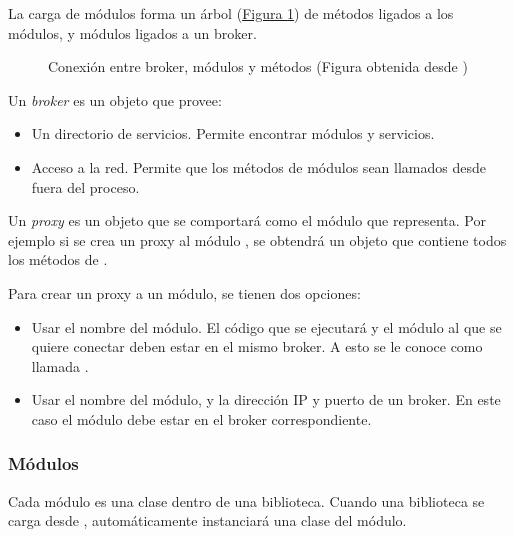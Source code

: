 La carga de módulos forma un árbol (\hyperref[\detokenize{chapter_one/naoqi:broker-mod-meth}]{Figura \ref{\detokenize{chapter_one/naoqi:broker-mod-meth}}}) de métodos
ligados a los módulos, y módulos ligados a un broker.

\begin{figure}[htbp]
\centering
\capstart

\noindent{}
\caption{Conexión entre broker, módulos y métodos (Figura obtenida desde \cite{brokermodulesmethods})}\label{\detokenize{chapter_one/naoqi:broker-mod-meth}}\end{figure}


\label{\detokenize{chapter_one/naoqi:broker}}
Un \textit{broker} es un objeto que provee:
\begin{itemize}
\item {} 
Un directorio de servicios. Permite encontrar módulos y servicios.

\item {} 
Acceso a la red. Permite que los métodos de módulos sean llamados desde fuera del proceso.

\end{itemize}

\label{\detokenize{chapter_one/naoqi:proxy}}
Un \textit{proxy} es un objeto que se comportará como el módulo que representa. Por
ejemplo si se crea un proxy al módulo , se obtendrá un objeto
que contiene todos los métodos de .

Para crear un proxy a un módulo, se tienen dos opciones:
\begin{itemize}
\item {} 
Usar el nombre del módulo. El código que se ejecutará y el módulo al que se quiere conectar deben estar en el mismo broker. A esto se le conoce como llamada .

\item {} 
Usar el nombre del módulo, y la dirección IP y puerto de un broker. En este caso el módulo debe estar en el broker correspondiente.

\end{itemize}


\subsubsection{Módulos}
\label{\detokenize{chapter_one/naoqi:modulos}}
Cada módulo es una clase dentro de una biblioteca. Cuando una
biblioteca se carga desde , automáticamente instanciará una clase del módulo.

